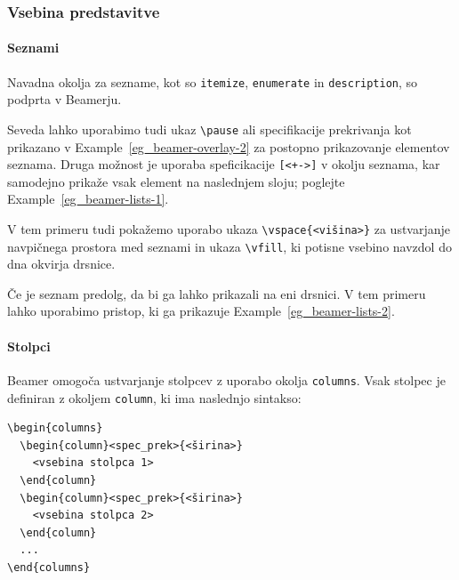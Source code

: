 \begin{example}\label{eg_overlayarea}\end{example}\subsubsection{Vsebina predstavitve}\label{beamer_vsebina}

\paragraph{Seznami}

Navadna okolja za sezname, kot so \texttt{itemize}, \texttt{enumerate} in \texttt{description}, so podprta v Beamerju.

Seveda lahko uporabimo tudi ukaz \texttt{{\textbackslash}pause} ali specifikacije prekrivanja kot prikazano v Example~\ref{eg_beamer-overlay-2} za postopno prikazovanje elementov seznama.
Druga možnost je uporaba speficikacije \texttt{[\textless +-\textgreater ]} v okolju seznama, kar samodejno prikaže vsak element na naslednjem sloju; poglejte Example~\ref{eg_beamer-lists-1}.

V tem primeru tudi pokažemo uporabo ukaza \texttt{{\textbackslash}vspace\{\textless višina\textgreater \}} za ustvarjanje navpičnega prostora med seznami in ukaza \texttt{{\textbackslash}vfill}, ki potisne vsebino navzdol do dna okvirja drsnice.

\begin{example}\label{eg_beamer-lists-1}\end{example}Če je seznam predolg, da bi ga lahko prikazali na eni drsnici. V tem primeru lahko uporabimo pristop, ki ga prikazuje Example~\ref{eg_beamer-lists-2}.

\begin{example}\label{eg_beamer-lists-2}\end{example}\paragraph{Stolpci}

Beamer omogoča ustvarjanje stolpcev z uporabo okolja \texttt{columns}. Vsak stolpec je definiran z okoljem \texttt{column}, ki ima naslednjo sintakso:

\begin{verbatim}
\begin{columns}
  \begin{column}<spec_prek>{<širina>}
    <vsebina stolpca 1>
  \end{column}
  \begin{column}<spec_prek>{<širina>}
    <vsebina stolpca 2>
  \end{column}
  ...
\end{columns}
\end{verbatim}

